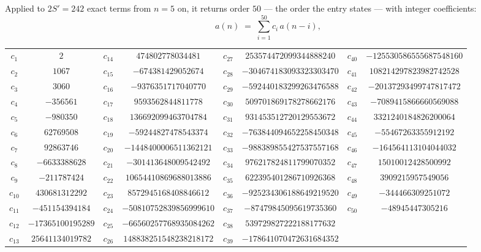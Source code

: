\documentclass[11pt,a4paper]{article}
\theoremstyle{plain}
\theoremstyle{definition}
\begin{document}
Applied to $2S'=242$ exact terms from $n=5$ on, it returns order $50$ --- the
order the entry states --- with integer coefficients:
\[
a(n)\;=\;\sum_{i=1}^{50}c_i\,a(n-i),
\]
\begin{center}\small
\begin{tabular}{cccccccc}
$c_{1}$ & $2$ & $c_{14}$ & $474802778034481$ & $c_{27}$ & $253574472099344888240$ & $c_{40}$ & $-125530586555687548160$ \\
$c_{2}$ & $1067$ & $c_{15}$ & $-674381429052674$ & $c_{28}$ & $-304674183093323303470$ & $c_{41}$ & $108214297823982742528$ \\
$c_{3}$ & $3060$ & $c_{16}$ & $-9376351717040770$ & $c_{29}$ & $-592440183299263476588$ & $c_{42}$ & $-20137293499747817472$ \\
$c_{4}$ & $-356561$ & $c_{17}$ & $9593562844811778$ & $c_{30}$ & $509701869178278662176$ & $c_{43}$ & $-7089415866660569088$ \\
$c_{5}$ & $-980350$ & $c_{18}$ & $136692099463704784$ & $c_{31}$ & $931453512720129553672$ & $c_{44}$ & $3321240184826200064$ \\
$c_{6}$ & $62769508$ & $c_{19}$ & $-59244827478543374$ & $c_{32}$ & $-763844094652258450348$ & $c_{45}$ & $-55467263355912192$ \\
$c_{7}$ & $92863746$ & $c_{20}$ & $-1448400006511362121$ & $c_{33}$ & $-988389855427537557168$ & $c_{46}$ & $-164564113104044032$ \\
$c_{8}$ & $-6633388628$ & $c_{21}$ & $-301413648009542492$ & $c_{34}$ & $976217824811799070352$ & $c_{47}$ & $15010012428500992$ \\
$c_{9}$ & $-211787424$ & $c_{22}$ & $10654410869688013886$ & $c_{35}$ & $622395401286710926368$ & $c_{48}$ & $3909215957549056$ \\
$c_{10}$ & $430681312292$ & $c_{23}$ & $8572945168408846612$ & $c_{36}$ & $-925234306188649219520$ & $c_{49}$ & $-344466309251072$ \\
$c_{11}$ & $-451154394184$ & $c_{24}$ & $-50810752839856999610$ & $c_{37}$ & $-87479845095619735360$ & $c_{50}$ & $-48945447305216$ \\
$c_{12}$ & $-17365100195289$ & $c_{25}$ & $-66560257768935084262$ & $c_{38}$ & $539729827222188177632$ &  &  \\
$c_{13}$ & $25641134019782$ & $c_{26}$ & $148838251548238218172$ & $c_{39}$ & $-178641070472631684352$ &  &  \\
\end{tabular}
\end{center}
\end{document}
